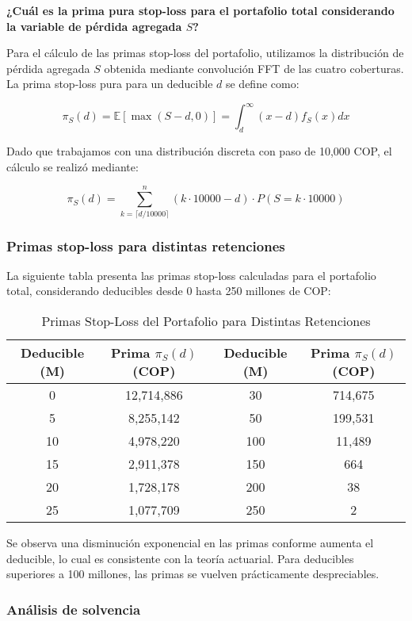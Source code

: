 \textbf{¿Cuál es la prima pura stop-loss para el portafolio total considerando la variable de pérdida agregada $S$?}

Para el cálculo de las primas stop-loss del portafolio, utilizamos la distribución de pérdida agregada $S$ obtenida mediante convolución FFT de las cuatro coberturas. La prima stop-loss pura para un deducible $d$ se define como:

$$\pi_S(d) = \mathbb{E}[\max(S - d, 0)] = \int_d^{\infty} (x - d) f_S(x) dx$$

Dado que trabajamos con una distribución discreta con paso de 10,000 COP, el cálculo se realizó mediante:

$$\pi_S(d) = \sum_{k=\lceil d/10000 \rceil}^{n} (k \cdot 10000 - d) \cdot P(S = k \cdot 10000)$$

\subsubsection{Primas stop-loss para distintas retenciones}

La siguiente tabla presenta las primas stop-loss calculadas para el portafolio total, considerando deducibles desde 0 hasta 250 millones de COP:

\begin{table}[H]
\centering
\caption{Primas Stop-Loss del Portafolio para Distintas Retenciones}
\begin{tabular}{cccc}
\hline
\textbf{Deducible (M)} & \textbf{Prima $\pi_S(d)$ (COP)} & \textbf{Deducible (M)} & \textbf{Prima $\pi_S(d)$ (COP)} \\
\hline
0 & 12,714,886 & 30 & 714,675 \\
5 & 8,255,142 & 50 & 199,531 \\
10 & 4,978,220 & 100 & 11,489 \\
15 & 2,911,378 & 150 & 664 \\

20 & 1,728,178 & 200 & 38 \\
25 & 1,077,709 & 250 & 2 \\
\hline
\end{tabular}
\end{table}

Se observa una disminución exponencial en las primas conforme aumenta el deducible, lo cual es consistente con la teoría actuarial. Para deducibles superiores a 100 millones, las primas se vuelven prácticamente despreciables.

\subsubsection{Análisis de solvencia}

